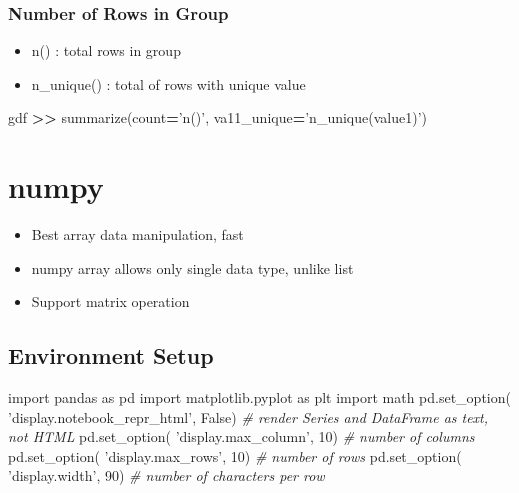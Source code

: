 \documentclass[
]{book}
\newenvironment{Shaded}{\begin{snugshade}}{\end{snugshade}}
\newcommand{\CommentTok}[1]{\textcolor[rgb]{0.37,0.37,0.37}{\textit{#1}}}
\newcommand{\DecValTok}[1]{\textcolor[rgb]{0.06,0.06,0.06}{#1}}
\newcommand{\ImportTok}[1]{#1}
\newcommand{\NormalTok}[1]{#1}
\newcommand{\OperatorTok}[1]{\textcolor[rgb]{0.43,0.43,0.43}{\textbf{#1}}}
\newcommand{\StringTok}[1]{\textcolor[rgb]{0.5,0.5,0.5}{#1}}
\newcommand{\VariableTok}[1]{\textcolor[rgb]{0,0,0}{#1}}
\providecommand{\tightlist}{%
  \setlength{\itemsep}{0pt}\setlength{\parskip}{0pt}}
\begin{document}
\hypertarget{number-of-rows-in-group}{%
\subsection{Number of Rows in Group}\label{number-of-rows-in-group}}

\begin{itemize}
\tightlist
\item
  n() : total rows in group\\
\item
  n\_unique() : total of rows with unique value
\end{itemize}

\begin{Shaded}
\begin{Highlighting}[]
\NormalTok{gdf }\OperatorTok{>>}\NormalTok{ summarize(count}\OperatorTok{=}\StringTok{'n()'}\NormalTok{, va11_unique}\OperatorTok{=}\StringTok{'n_unique(value1)'}\NormalTok{)}
\end{Highlighting}
\end{Shaded}

\hypertarget{numpy-1}{%
\chapter{numpy}\label{numpy-1}}

\begin{itemize}
\tightlist
\item
  Best array data manipulation, fast\\
\item
  numpy array allows only single data type, unlike list\\
\item
  Support matrix operation
\end{itemize}

\hypertarget{environment-setup}{%
\section{Environment Setup}\label{environment-setup}}

\begin{Shaded}
\begin{Highlighting}[]
\ImportTok{import}\NormalTok{ pandas }\ImportTok{as}\NormalTok{ pd}
\ImportTok{import}\NormalTok{ matplotlib.pyplot }\ImportTok{as}\NormalTok{ plt}
\ImportTok{import}\NormalTok{ math}
\NormalTok{pd.set_option( }\StringTok{'display.notebook_repr_html'}\NormalTok{, }\VariableTok{False}\NormalTok{)  }\CommentTok{# render Series and DataFrame as text, not HTML}
\NormalTok{pd.set_option( }\StringTok{'display.max_column'}\NormalTok{, }\DecValTok{10}\NormalTok{)    }\CommentTok{# number of columns}
\NormalTok{pd.set_option( }\StringTok{'display.max_rows'}\NormalTok{, }\DecValTok{10}\NormalTok{)     }\CommentTok{# number of rows}
\NormalTok{pd.set_option( }\StringTok{'display.width'}\NormalTok{, }\DecValTok{90}\NormalTok{)        }\CommentTok{# number of characters per row}
\end{Highlighting}
\end{Shaded}
\end{document}
